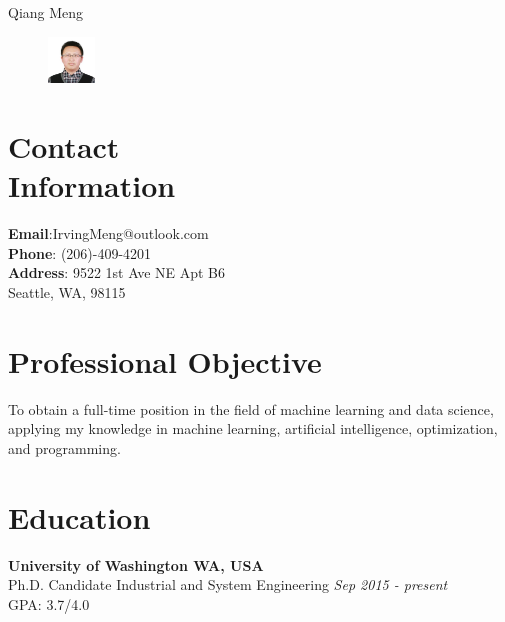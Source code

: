 \documentclass[margin,line,11pt]{resume}
\begin{document}
{\sc \Large Qiang Meng}
\begin{resume}


    \vspace{0.5cm}
    \begin{figure}
         \vspace{-0.9cm}
        \begin{center}
        \includegraphics[width=0.11\textwidth]{face}
        \end{center}
         \vspace{-1cm}
    \end{figure}

 
    \section{\mysidestyle Contact\\Information}
    \textbf{Email}:\hspace{1.5em}\quad  IrvingMeng@outlook.com \\
    \textbf{Phone}: \hspace{1.5em} (206)-409-4201\\ 
    \textbf{Address}: \hspace{1em}9522 1st Ave NE Apt B6\\
     \hspace*{6em}Seattle, WA, 98115 

    \section{\mysidestyle Professional Objective}
 To obtain a full-time position in the field of machine learning and data science, applying my knowledge in machine learning, artificial intelligence, optimization, and programming.
      

     \section{\mysidestyle Education}
     \textbf{University of Washington  \hfill WA, USA}\\
Ph.D. Candidate \quad  Industrial and System Engineering \hfill \textit{Sep 2015 - present}\\
 GPA: 3.7/4.0 \par


\end{resume}
\end{document}
